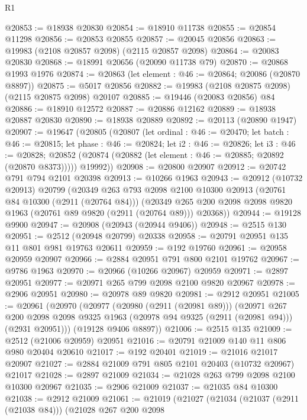 \begin{lexlean}{R1}
\begin{coremodule}
@20853 := @18938 @20830
@20854 := @18910 @11738
@20855 := @20854 @11298
@20856 := @20853 @20855
@20857 := @20045 @20856
@20863 := @19983 (@2108 @20857 @2098) (@2115 @20857 @2098)
@20864 := @20083 @20830
@20868 := @18991 @20656 (@20090 @11738 @79)
@20870 := @20868 @1993 @1976
@20874 := @20863 (let element : @46 := @20864; @20086 (@20870 @8897))
@20875 := @5017 @20856
@20882 := @19983 (@2108 @20875 @2098) (@2115 @20875 @2098) @20107
@20885 := @19446 (@20083 @20856) @84
@20886 := @18910 @12572
@20887 := @20886 @12162
@20889 := @18938 @20887 @20830
@20890 := @18938 @20889
@20892 := @20113 (@20890 @1947)
@20907 := @19647
    (@20805
      (@20807
        (let ordinal : @46 := @20470;
        let batch : @46 := @20815;
        let phase : @46 := @20824;
        let i2 : @46 := @20826;
        let i3 : @46 := @20828;
        @20852 (@20874 (@20882 (let element : @46 := @20885; @20892 (@20870 @8373)))))
        @19992))
@20908 := @20800 @20907
@20912 := @20742 @791 @794 @2101 @20398
@20913 := @10266 @1963
@20943 := @20912
    (@10732 @20913)
    @20799
    (@20349
      @263
      @793
      @2098
      @2100
      @10300
      @20913
      (@20761 @84 @10300 (@2911 (@20764 @84)))
      (@20349 @265 @200 @2098 @2098 @9820 @1963 (@20761 @89 @9820 (@2911 (@20764 @89))) @20368))
@20944 := @19128 @9900
@20947 := @20908 (@20943 (@20944 @9406))
@20948 := @2515 @130
@20951 := @2512 (@20948 @20799) @20338
@20958 := @20791 @20951 @135 @11 @801 @981 @19763 @20611
@20959 := @192 @19760
@20961 := @20958 @20959 @20907
@20966 := @2884 @20951 @791 @800 @2101 @19762
@20967 := @9786 @1963
@20970 := @20966 (@10266 @20967) @20959
@20971 := @2897 @20951
@20977 := @20971 @265 @799 @2098 @2100 @9820 @20967
@20978 := @2906 @20951
@20980 := @20978 @89 @9820
@20981 := @2912 @20951
@21005 := @20961
    (@20970
      (@20977
        (@20980 (@2911 (@20981 @89)))
        (@20971
          @267
          @200
          @2098
          @2098
          @9325
          @1963
          (@20978 @94 @9325 (@2911 (@20981 @94)))
          (@2931 @20951)))
      (@19128 @9406 @8897))
@21006 := @2515 @135
@21009 := @2512 (@21006 @20959) @20951
@21016 := @20791 @21009 @140 @11 @806 @980 @20404 @20610
@21017 := @192 @20401
@21019 := @21016 @21017 @20907
@21027 := @2884 @21009 @791 @805 @2101 @20403 (@10732 @20967) @21017
@21028 := @2897 @21009
@21034 := @21028 @263 @799 @2098 @2100 @10300 @20967
@21035 := @2906 @21009
@21037 := @21035 @84 @10300
@21038 := @2912 @21009
@21061 := @21019
    (@21027
      (@21034
        (@21037 (@2911 (@21038 @84)))
        (@21028
          @267
          @200
          @2098

\end{coremodule}
\end{lexlean}
